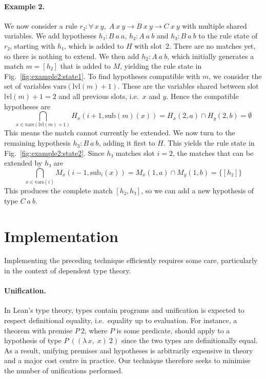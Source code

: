 \documentclass[runningheads]{llncs}
\newcommand{\Lam}[2]{\ensuremath{\lambda\, #1,\; #2}}
\newcommand{\All}[2]{\ensuremath{\forall\, #1,\; #2}}
\newcommand{\vars}{\ensuremath{\mathrm{vars}}}
\newcommand{\sub}{\ensuremath{\mathrm{sub}}}
\newcommand{\lvl}{\ensuremath{\mathrm{lvl}}}
\begin{document}
\paragraph{Example 2.}
We now consider a rule $r₂ : \All{x~y}{A~x~y → B~x~y → C~x~y}$ with multiple shared variables.
We add hypotheses $h₁ : B~a~a$, $h₂ : A~a~b$ and $h₃ : B~a~b$ to the rule state of $r₂$, starting with $h₁$, which is added to $H$ with slot~2.
There are no matches yet, so there is nothing to extend.
We then add $h_2 : A~a~b$, which initially generates a match $m = [h₂]$ that is added to $M$, yielding the rule state in Fig.~\ref{fig:example2:state1}.
To find hypotheses compatible with $m$, we consider the set of variables $\vars(\lvl(m) + 1)$.
These are the variables shared between slot~$\lvl(m) + 1 = 2$ and all previous slots, i.e.\ $x$ and $y$.
Hence the compatible hypotheses are
\[
  \bigcap_{x \in \vars(\lvl(m) + 1)} H_{x}(i + 1, \sub(m)(x)) = H_{x}(2, a) \cap H_{y}(2, b) = \emptyset
\]
This means the match cannot currently be extended.
We now turn to the remaining hypothesis $h_3 : B~a~b$, adding it first to $H$.
This yields the rule state in Fig.~\ref{fig:example2:state2}.
Since $h₃$ matches slot $i = 2$, the matches that can be extended by $h₃$ are
\[
  \bigcap_{x \in \vars(i)} M_{x}(i - 1, \sub_{i}(x)) = M_{x}(1, a) \cap M_{y}(1, b) = \{[h₂]\}
\]
This produces the complete match $[h₂, h₃]$, so we can add a new hypothesis of type $C~a~b$.

\section{Implementation}%
\label{sec:implementation}

Implementing the preceding technique efficiently requires some care, particularly in the context of dependent type theory.

\paragraph{Unification.}
In Lean's type theory, types contain programs and unification is expected to respect definitional equality, i.e.\ equality up to evaluation.
For instance, a theorem with premise $P~2$, where $P$ is some predicate, should apply to a hypothesis of type $P~((\Lam{x}{x})~2)$ since the two types are definitionally equal.
As a result, unifying premises and hypotheses is arbitrarily expensive in theory and a major cost centre in practice.
Our technique therefore seeks to minimise the number of unifications performed.
\end{document}
